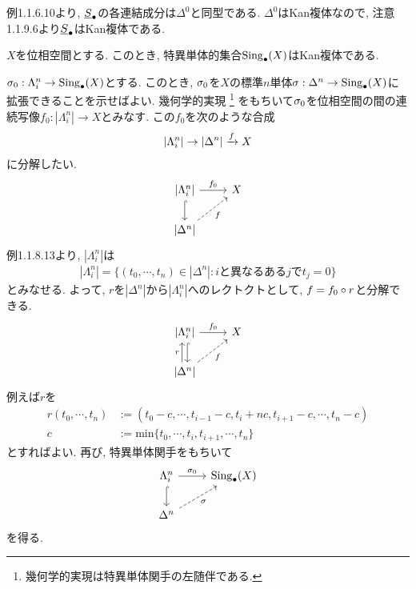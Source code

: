\documentclass[uplatex, a4paper, 14Q, dvipdfmx]{jsreport}
\begin{document}
\begin{Proof}
  例1.1.6.10より, $\uline{S}_\bullet$の各連結成分は$\Delta^0$と同型である. 
  $\Delta^0$はKan複体なので, 注意1.1.9.6より$\uline{S}_\bullet$はKan複体である. 
\end{Proof}

\begin{prop}
  $X$を位相空間とする. 
  このとき, 特異単体的集合$\mathrm{Sing}_\bullet(X)$はKan複体である. 
\end{prop}

\begin{Proof}
  $\sigma_0: \Lambda^n_i \to \mathrm{Sing}_\bullet(X)$とする. 
  このとき, $\sigma_0$を$X$の標準$n$単体$\sigma: \Delta^n \to \mathrm{Sing}_\bullet(X)$に拡張できることを示せばよい. 
  幾何学的実現
  \footnote{
    幾何学的実現は特異単体関手の左随伴である. 
  }
  をもちいて$\sigma_0$を位相空間の間の連続写像$f_0: |\Lambda^n_i| \to X$とみなす. 
  この$f_0$を次のような合成
  \begin{align*}
    |\Lambda^n_i| \to |\Delta^n| \xrightarrow{f} X
  \end{align*}
  に分解したい. 
  \[\begin{tikzcd}
    {|\Lambda^n_i|} & {X} \\
    {|\Delta^n|}
    \arrow["{f_0}", from=1-1, to=1-2]
    \arrow["f"', dashed, from=2-1, to=1-2]
    \arrow[hook, from=1-1, to=2-1]
  \end{tikzcd}\]
  例1.1.8.13より, $|\Lambda^n_i|$は
  \begin{align*}
    |\Lambda^n_i| = \{(t_0,\cdots,t_n) \in |\Delta^n| : i\text{と異なるある}j \text{で} t_j=0\}
  \end{align*}
  とみなせる.
  よって, $r$を$|\Delta^n|$から$|\Lambda^n_i|$へのレクトクトとして, $f=f_0 \circ r$と分解できる. 
  \[\begin{tikzcd}
    {|\Lambda^n_i|} & {X} \\
    {|\Delta^n|}
    \arrow["{f_0}", from=1-1, to=1-2]
    \arrow["f"', dashed, from=2-1, to=1-2]
    \arrow[shift left=1, hook, from=1-1, to=2-1]
    \arrow["r", shift left=1, from=2-1, to=1-1]
  \end{tikzcd}\]
  例えば$r$を
  \begin{align*}
    r(t_0,\cdots,t_n) &:= (t_0-c,\cdots,t_{i-1}-c,t_i+nc,t_{i+1}-c,\cdots,t_n-c) \\
    c &:= \mathrm{min}\{t_0,\cdots,t_i,t_{i+1},\cdots,t_n\}
  \end{align*}
  とすればよい. 
  再び, 特異単体関手をもちいて
  \[\begin{tikzcd}
    {\Lambda^n_i} & {\Sing_\bullet(X)} \\
    {\Delta^n}
    \arrow["{\si_0}", from=1-1, to=1-2]
    \arrow["\si"', dashed, from=2-1, to=1-2]
    \arrow[hook, from=1-1, to=2-1]
  \end{tikzcd}\]
  を得る. 
\end{Proof}
\end{document}
